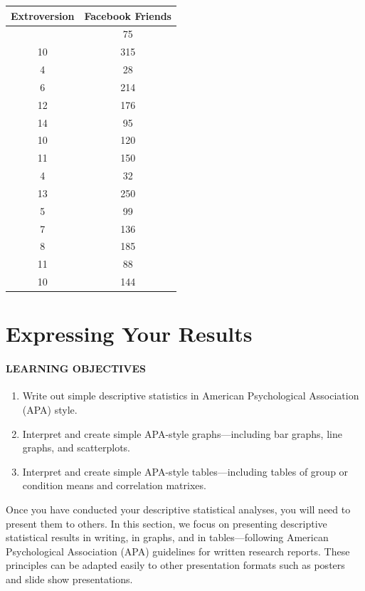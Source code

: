 \documentclass[
]{krantz}
\providecommand{\tightlist}{%
  \setlength{\itemsep}{0pt}\setlength{\parskip}{0pt}}
\begin{document}
\begin{longtable}[]{@{}cc@{}}
\toprule\noalign{}
Extroversion & Facebook Friends \\
\midrule\noalign{}
\endhead
\bottomrule\noalign{}
\endlastfoot
8 & 75 \\
10 & 315 \\
4 & 28 \\
6 & 214 \\
12 & 176 \\
14 & 95 \\
10 & 120 \\
11 & 150 \\
4 & 32 \\
13 & 250 \\
5 & 99 \\
7 & 136 \\
8 & 185 \\
11 & 88 \\
10 & 144 \\
\end{longtable}

\section{Expressing Your Results}\label{expressing-your-results}

\paragraph*{LEARNING OBJECTIVES}\label{learning-objectives-35}

\begin{enumerate}
\def\labelenumi{\arabic{enumi}.}
\tightlist
\item
  Write out simple descriptive statistics in American Psychological Association (APA) style.
\item
  Interpret and create simple APA-style graphs---including bar graphs, line graphs, and scatterplots.
\item
  Interpret and create simple APA-style tables---including tables of group or condition means and correlation matrixes.
\end{enumerate}

Once you have conducted your descriptive statistical analyses, you will need to present them to others. In this section, we focus on presenting descriptive statistical results in writing, in graphs, and in tables---following American Psychological Association (APA) guidelines for written research reports. These principles can be adapted easily to other presentation formats such as posters and slide show presentations.
\end{document}
